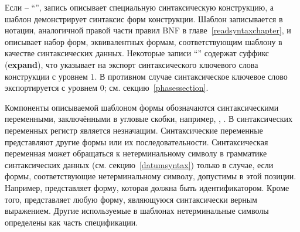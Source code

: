 Если  -- ``\exprtype'', запись описывает специальную синтаксическую
конструкцию, а шаблон демонстрирует синтаксис форм конструкции. Шаблон записывается в
нотации, аналогичной правой части правил BNF в главе~\ref{readsyntaxchapter}, и описывает
набор форм, эквивалентных формам, соответствующим шаблону в качестве синтаксических
данных. Некоторые записи ``\exprtype'' содержат суффикс ({\bfseries\cf expand}), что указывает
на экспорт синтаксического ключевого слова конструкции с уровнем $1$. В противном случае
синтаксическое ключевое слово экспортируется с уровнем $0$; см. секцию~\ref{phasessection}.\vspace{2mm}

Компоненты описываемой шаблоном формы обозначаются синтаксическими переменными, заключёнными
в угловые скобки, например, , . В синтаксических переменных
регистр является незначащим. Синтаксические переменные представляют другие формы или их
последовательности. Синтаксическая переменная может обращаться к нетерминальному символу в
грамматике синтаксических данных (см. секцию~\ref{datumsyntax}) только в случае, если формы,
соответствующие нетерминальному символу, допустимы в этой позиции. Например, 
представляет форму, которая должна быть идентификатором. Кроме того, 
представляет любую форму, являющуюся синтаксически верным выражением. Другие используемые
в шаблонах нетерминальные символы определены как часть спецификации.\vspace{2mm}

